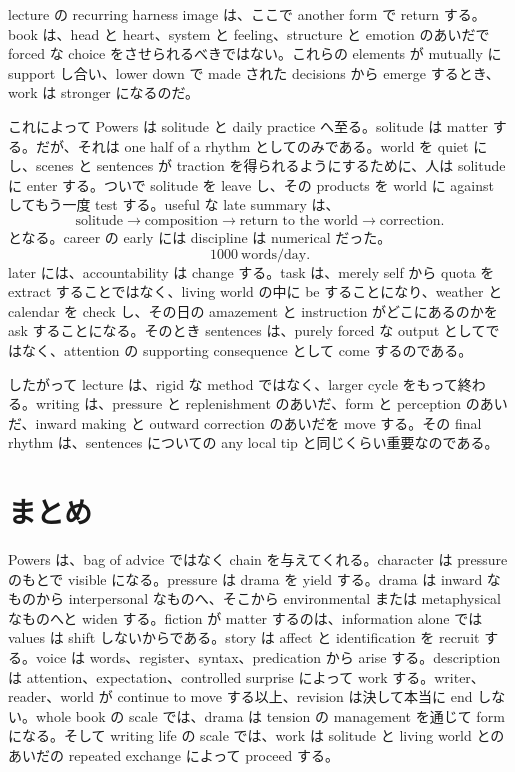 lecture の recurring harness image は、ここで another form で return する。book は、head と heart、system と feeling、structure と emotion のあいだで forced な choice をさせられるべきではない。これらの elements が mutually に support し合い、lower down で made された decisions から emerge するとき、work は stronger になるのだ。

これによって Powers は solitude と daily practice へ至る。solitude は matter する。だが、それは one half of a rhythm としてのみである。world を quiet にし、scenes と sentences が traction を得られるようにするために、人は solitude に enter する。ついで solitude を leave し、その products を world に against してもう一度 test する。useful な late summary は、
\begin{equation}
\text{solitude} \to \text{composition} \to \text{return to the world} \to \text{correction}.
\end{equation}
となる。career の early には discipline は numerical だった。
\begin{equation}
1000\ \text{words/day}.
\end{equation}
later には、accountability は change する。task は、merely self から quota を extract することではなく、living world の中に be することになり、weather と calendar を check し、その日の amazement と instruction がどこにあるのかを ask することになる。そのとき sentences は、purely forced な output としてではなく、attention の supporting consequence として come するのである。

したがって lecture は、rigid な method ではなく、larger cycle をもって終わる。writing は、pressure と replenishment のあいだ、form と perception のあいだ、inward making と outward correction のあいだを move する。その final rhythm は、sentences についての any local tip と同じくらい重要なのである。

\section{まとめ}

Powers は、bag of advice ではなく chain を与えてくれる。character は pressure のもとで visible になる。pressure は drama を yield する。drama は inward なものから interpersonal なものへ、そこから environmental または metaphysical なものへと widen する。fiction が matter するのは、information alone では values は shift しないからである。story は affect と identification を recruit する。voice は words、register、syntax、predication から arise する。description は attention、expectation、controlled surprise によって work する。writer、reader、world が continue to move する以上、revision は決して本当に end しない。whole book の scale では、drama は tension の management を通じて form になる。そして writing life の scale では、work は solitude と living world とのあいだの repeated exchange によって proceed する。